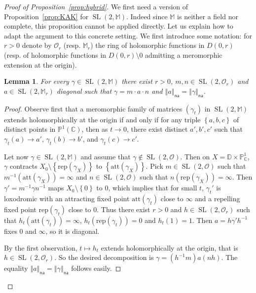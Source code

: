 \documentclass[10pt]{amsart}
\newtheorem{lemm}[theo]{Lemma}\newtheorem{prop}[theo]{Proposition}\newtheorem{coro}[theo]{Corollary}\newtheorem{conj}[theo]{Conjecture}
\theoremstyle{definition}\newtheorem{defi}[theo]{Definition}\newtheorem{rema}[theo]{Remark}\newtheorem{exam}[theo]{Example}\newtheorem{exem}[theo]{Example}\newtheorem{nota}[theo]{Notation}
\DeclareMathOperator{\SL}{SL}
\newcommand{\cc}{\mathbb{C}}
\newcommand{\dD}{\mathbb{D}}
\newcommand{\mm}{\mathbb{M}}
\newcommand{\set}[1]{\left\{#1\right\}}
\newcommand{\norm}[1]{\left\Vert#1\right\Vert}
\newcommand{\pu}{{\mathbb{P}^1}}
\newcommand{\PP}{\mathbb{P}}
\newcommand{\att}{\mathrm{att}}
\newcommand{\rep}{\mathrm{rep}}
\newcommand{\na}{\mathsf{na}}
\newcommand{\inv}{^{-1}}
\begin{document}
\begin{proof}[Proof of Proposition~\ref{prop:hybrid}]
We first need a version of Proposition~\ref{prop:KAK} for $\SL(2, \mm)$. Indeed since $\mm$ is neither a field nor complete, this proposition cannot be applied directly. Let us explain how to adapt the argument to this concrete setting. We first introduce some notation: for $r>0$ denote by $\mathcal{O}_r$ (resp. $\mm_r$) the ring of holomorphic functions in $D(0, r)$ (resp. of holomorphic functions in $D(0, r)\setminus {0}$ admitting a meromorphic extension at the origin).

\begin{lemm}\label{lem:KAK holomorphe}
For every $\gamma\in \SL(2, \mm)$ there exist $r>0$, $m,n \in \SL(2,\mathcal{O}_r)$ and $a \in \SL(2, \mm_r)$ diagonal such that $\gamma= m\cdot a \cdot n$ and $\norm{a}_\na = \norm{\gamma}_\na$.
\end{lemm}

\begin{proof}
Observe first that a meromorphic family of matrices $(\gamma_t)$ in $\SL(2, \mm)$ extends holomorphically at the origin if and only if for any triple $\set{a,b,c}$ of distinct points in $\pu(\cc)$, then as $t\to 0$, there exist distinct $a',b',c'$ such that $\gamma_t(a)\to a'$, $\gamma_t(b)\to b'$, and $\gamma_t(c)\to c'$.

Let now $\gamma\in \SL(2, \mm)$ and assume that $\gamma\notin\SL(2, \mathcal{O})$. Then on $X = \dD\times \PP^1_\cc$, $\gamma$ contracts $X_0\setminus\set{\rep(\gamma_X)}$ to $\set{\att(\gamma_X)}$. Pick $m\in \SL(2, \mathcal{O})$ such that $m\inv(\att(\gamma_X)) = \infty$ and $n\in \SL(2, \mathcal{O})$ such that $n(\rep(\gamma_X)) = \infty$. Then $\gamma' = m\inv\gamma n\inv$ maps $X_0\setminus\set{0}$ to $0$, which implies that for small $t$, $\gamma_t'$ is loxodromic with an attracting fixed point $\att(\gamma_t)$ close to $\infty$ and a repelling fixed point $\rep(\gamma_t)$ close to $0$. Thus there exist $r>0$ and $h\in \SL(2, \mathcal{O}_r)$ such that $h_t(\att(\gamma_t)) =\infty$, $h_t(\rep(\gamma_t)) = 0$ and $h_t(1) =1$. Then $a= h\gamma'h^{-1}$ fixes 0 and $\infty$, so it is diagonal.

By the first observation, $t\mapsto h_t$ extends holomorphically at the origin, that is $h\in \SL(2, \mathcal{O}_r)$. So the desired decomposition is $\gamma = (h\inv m) a (n h)$. The equality $\norm{a}_\na = \norm{\gamma}_\na$ follows easily.
\end{proof}


\end{proof}
\end{document}
